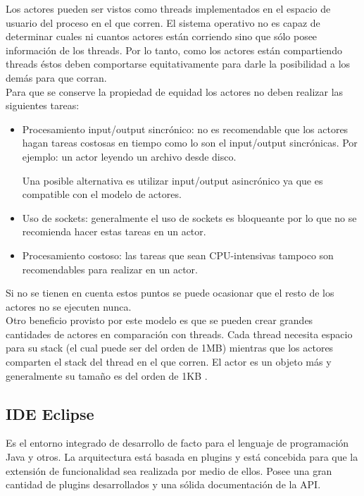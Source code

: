 \documentclass[12pt,a4paper]{article}
\begin{document}
Los actores pueden ser vistos como threads implementados en el espacio de usuario del proceso en el que corren. El
sistema operativo no es capaz de determinar cuales ni cuantos actores están corriendo sino que sólo posee información de los
threads. Por lo tanto, como los actores están compartiendo threads éstos deben comportarse equitativamente para darle la
posibilidad a los demás para que corran. \\

Para que se conserve la propiedad de equidad los actores no deben realizar las siguientes tareas:

\begin{itemize}
\item Procesamiento input/output sincrónico: no es recomendable que los actores hagan tareas costosas en tiempo como 
lo son el input/output sincrónicas. Por ejemplo: un actor leyendo un archivo desde disco.

Una posible alternativa es utilizar input/output asincrónico ya que es compatible con el modelo de actores.

\item Uso de sockets: generalmente el uso de sockets es bloqueante por lo que no se recomienda hacer estas
tareas en un actor.

\item Procesamiento costoso: las tareas que sean CPU-intensivas tampoco son recomendables para realizar en un actor.
\end{itemize} 

Si no se tienen en cuenta estos puntos se puede ocasionar que el resto de los actores no se ejecuten nunca. \\

Otro beneficio provisto por este modelo es que se pueden crear grandes cantidades de actores en comparación con
threads. Cada thread necesita espacio para su stack (el cual puede ser del orden de 1MB) mientras que los actores
comparten el stack del thread en el que corren. El actor es un objeto más y generalmente su tamaño es del orden de 1KB
\cite{actores-size}.

\subsection{IDE Eclipse}
Es el entorno integrado de desarrollo de facto para el lenguaje de programación Java y otros. La arquitectura está
basada en plugins y está concebida para que la extensión de funcionalidad sea realizada por medio de ellos. 
Posee una gran cantidad de plugins desarrollados y una sólida documentación de la API.
\end{document}
